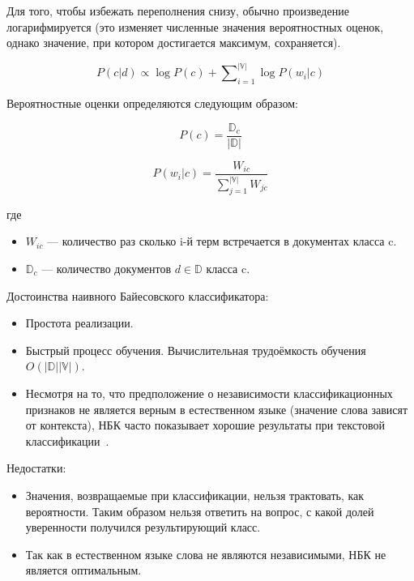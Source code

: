 Для того, чтобы избежать переполнения снизу, обычно произведение
логарифмируется (это изменяет численные значения вероятностных оценок, 
однако значение, при котором достигается максимум, сохраняется).

\begin{equation}
P(c | d) \propto \log P(c) + \sum\nolimits_{i=1}^{|\mathbb{V}|} \log P(w_i | c) 
\end{equation}

Вероятностные оценки определяются следующим образом:

\begin{equation}
P(c) = \frac{\mathbb{D}_c}{|\mathbb{D}|}
\end{equation}

\begin{equation}
P(w_i | c) = \frac{W_{ic}}{\sum\nolimits_{j=1}^{|\mathbb{V}|} W_{jc}}
\end{equation}

где 
\begin{itemize}

\item
$W_{ic}$ --- количество раз сколько i-й терм встречается в документах класса c.

\item
$\mathbb{D}_c$ --- количество документов $d \in \mathbb{D}$ класса c.

\end{itemize}

Достоинства наивного Байесовского классификатора:
\begin{itemize}

\item
Простота реализации.

\item
Быстрый процесс обучения. Вычислительная трудоёмкость обучения $O(|\mathbb{D}| |\mathbb{V}|)$.

\item
Несмотря на то, что предположение о независимости классификационных 
признаков не является верным в естественном языке (значение слова зависят от контекста), 
НБК часто показывает хорошие результаты при текстовой классификации~\cite{Pang2002}. 

\end{itemize}

Недостатки:
\begin{itemize}

\item
Значения, возвращаемые при классификации, нельзя трактовать, 
как вероятности. Таким образом нельзя ответить на вопрос, 
с какой долей уверенности получился результирующий класс. 

\item
Так как в естественном языке слова не являются независимыми,
НБК не является оптимальным.

\end{itemize}

